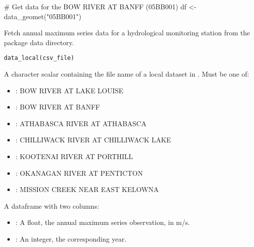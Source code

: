 \documentclass[a4paper]{book}
\begin{document}
%
\begin{SeeAlso}
\end{SeeAlso}
%
\begin{Examples}
\begin{ExampleCode}
# Get data for the BOW RIVER AT BANFF (05BB001)
df <- data_geomet("05BB001")

\end{ExampleCode}
\end{Examples}
%
\begin{Description}
Fetch annual maximum series data for a hydrological monitoring station
from the package data directory.
\end{Description}
%
\begin{Usage}
\begin{verbatim}
data_local(csv_file)
\end{verbatim}
\end{Usage}
%
\begin{Arguments}
\begin{ldescription}
\item[\code{csv\_file}] A character scalar containing the file name of a local dataset in
. Must be one of:
\begin{itemize}

\item{} : BOW RIVER AT LAKE LOUISE
\item{} : BOW RIVER AT BANFF
\item{} : ATHABASCA RIVER AT ATHABASCA
\item{} : CHILLIWACK RIVER AT CHILLIWACK LAKE
\item{} : KOOTENAI RIVER AT PORTHILL
\item{} : OKANAGAN RIVER AT PENTICTON
\item{} : MISSION CREEK NEAR EAST KELOWNA

\end{itemize}

\end{ldescription}
\end{Arguments}
%
\begin{Value}
A dataframe with two columns:
\begin{itemize}

\item{} : A float, the annual maximum series observation, in m/s.
\item{} : An integer, the corresponding year.

\end{itemize}

\end{Value}
\end{document}
